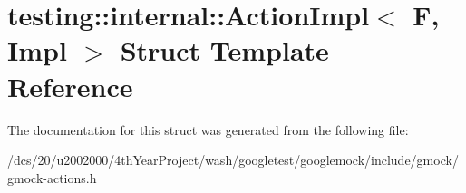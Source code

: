 \hypertarget{structtesting_1_1internal_1_1ActionImpl}{}\section{testing\+:\+:internal\+:\+:Action\+Impl$<$ F, Impl $>$ Struct Template Reference}
\label{structtesting_1_1internal_1_1ActionImpl}


The documentation for this struct was generated from the following file\+:\begin{DoxyCompactItemize}
\item 
/dcs/20/u2002000/4th\+Year\+Project/wash/googletest/googlemock/include/gmock/gmock-\/actions.\+h\end{DoxyCompactItemize}

